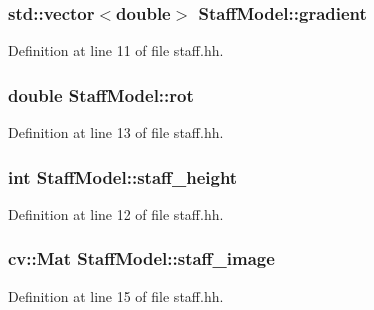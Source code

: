 \subsubsection[{\texorpdfstring{gradient}{gradient}}]{\setlength{\rightskip}{0pt plus 5cm}std\+::vector$<$double$>$ Staff\+Model\+::gradient}\hypertarget{structStaffModel_a2c7b2b9d75456613e3543ccf9538ca94}{}\label{structStaffModel_a2c7b2b9d75456613e3543ccf9538ca94}


Definition at line 11 of file staff.\+hh.

\subsubsection[{\texorpdfstring{rot}{rot}}]{\setlength{\rightskip}{0pt plus 5cm}double Staff\+Model\+::rot}\hypertarget{structStaffModel_aa887f6067d99543cc6ffaa237f19ef87}{}\label{structStaffModel_aa887f6067d99543cc6ffaa237f19ef87}


Definition at line 13 of file staff.\+hh.

\subsubsection[{\texorpdfstring{staff\+\_\+height}{staff_height}}]{\setlength{\rightskip}{0pt plus 5cm}int Staff\+Model\+::staff\+\_\+height}\hypertarget{structStaffModel_a4bc9a16b2d5cdd2ba93926e2f208acf7}{}\label{structStaffModel_a4bc9a16b2d5cdd2ba93926e2f208acf7}


Definition at line 12 of file staff.\+hh.

\subsubsection[{\texorpdfstring{staff\+\_\+image}{staff_image}}]{\setlength{\rightskip}{0pt plus 5cm}cv\+::\+Mat Staff\+Model\+::staff\+\_\+image}\hypertarget{structStaffModel_a52f39a8c36879ed8e536fe6e3f89aeb7}{}\label{structStaffModel_a52f39a8c36879ed8e536fe6e3f89aeb7}


Definition at line 15 of file staff.\+hh.

